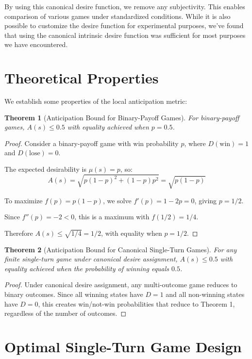 \documentclass{article}
\newtheorem{theorem}{Theorem}
\begin{document}
By using this canonical desire function, we remove any subjectivity. This enables comparison of various games under standardized conditions.
While it is also possible to customize the desire function for experimental purposes, we've found that using the canonical intrinsic desire function was sufficient for most purposes we have encountered.

\section{Theoretical Properties}

We establish some properties of the local anticipation metric:

\begin{theorem}[Anticipation Bound for Binary-Payoff Games]
For binary-payoff games, $A(s) \leq 0.5$ with equality achieved when $p = 0.5$.
\end{theorem}

\begin{proof}
Consider a binary-payoff game with win probability $p$, where $D(\text{win}) = 1$ and $D(\text{lose}) = 0$.

The expected desirability is $\mu(s) = p$, so:
\[
A(s) = \sqrt{p(1-p)^2 + (1-p)p^2} = \sqrt{p(1-p)}
\]

To maximize $f(p) = p(1-p)$, we solve $f'(p) = 1-2p = 0$, giving $p = 1/2$.

Since $f''(p) = -2 < 0$, this is a maximum with $f(1/2) = 1/4$.

Therefore $A(s) \leq \sqrt{1/4} = 1/2$, with equality when $p = 1/2$.
\end{proof}

\begin{theorem}[Anticipation Bound for Canonical Single-Turn Games]
For any finite single-turn game under canonical desire assignment, $A(s) \leq 0.5$ with equality achieved when the probability of winning equals $0.5$.
\end{theorem}

\begin{proof}
Under canonical desire assignment, any multi-outcome game reduces to binary outcomes. Since all winning states have $D = 1$ and all non-winning states have $D = 0$, this creates win/not-win probabilities that reduce to Theorem 1, regardless of the number of outcomes.
\end{proof}

\section{Optimal Single-Turn Game Design}
\end{document}
